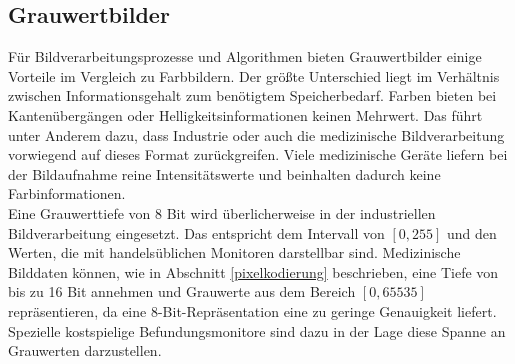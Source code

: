 \subsection{Grauwertbilder} \label{grey_images}

Für Bildverarbeitungsprozesse und Algorithmen bieten Grauwertbilder einige Vorteile im Vergleich zu Farbbildern. Der größte Unterschied liegt im Verhältnis zwischen Informationsgehalt zum benötigtem Speicherbedarf. Farben bieten bei Kantenübergängen oder Helligkeitsinformationen keinen Mehrwert. Das führt unter Anderem dazu, dass Industrie oder auch die medizinische Bildverarbeitung vorwiegend auf dieses Format zurückgreifen. Viele medizinische Geräte liefern bei der Bildaufnahme reine Intensitätswerte und beinhalten dadurch keine Farbinformationen.\\
Eine Grauwerttiefe von 8 Bit wird überlicherweise in der industriellen Bildverarbeitung eingesetzt. Das entspricht dem Intervall von $[0,255]$ und den Werten, die mit handelsüblichen Monitoren darstellbar sind. Medizinische Bilddaten können, wie in Abschnitt \ref{pixelkodierung} beschrieben, eine Tiefe von bis zu 16 Bit annehmen und Grauwerte aus dem Bereich $[0,65535]$ repräsentieren, da eine 8-Bit-Repräsentation eine zu geringe Genauigkeit liefert. Spezielle kostspielige Befundungsmonitore sind dazu in der Lage diese Spanne an Grauwerten darzustellen.

